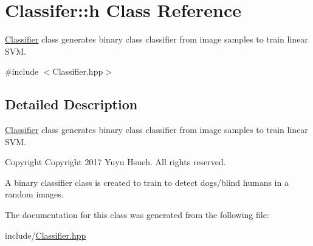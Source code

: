 \hypertarget{classClassifer_1_1h}{}\section{Classifer\+:\+:h Class Reference}
\label{classClassifer_1_1h}


\hyperlink{classClassifier}{Classifier} class generates binary class classifier from image samples  to train linear S\+VM.  




{\ttfamily \#include $<$Classifier.\+hpp$>$}



\subsection{Detailed Description}
\hyperlink{classClassifier}{Classifier} class generates binary class classifier from image samples  to train linear S\+VM. 

\begin{DoxyCopyright}{Copyright}
Copyright 2017 Yuyu Hsueh. All rights reserved.
\end{DoxyCopyright}
A binary classifier class is created to train to detect dogs/blind humans in a random images. 

The documentation for this class was generated from the following file\+:\begin{DoxyCompactItemize}
\item 
include/\hyperlink{Classifier_8hpp}{Classifier.\+hpp}\end{DoxyCompactItemize}
